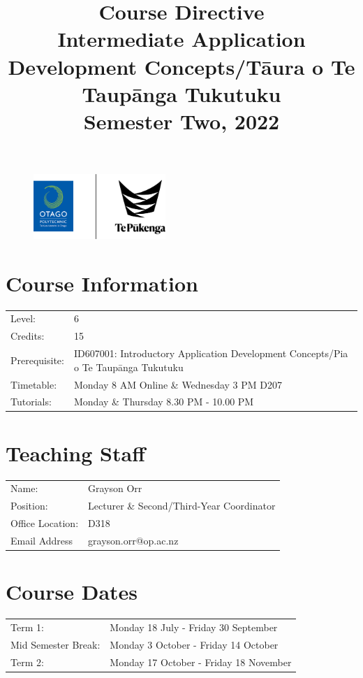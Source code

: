 \documentclass{article}
\author{}
\begin{document}
\begin{figure}
	\includegraphics[width=50mm]{../img/logo.png}
\end{figure}

\title{Course Directive\\Intermediate Application Development Concepts/Tāura o Te Taupānga Tukutuku\\Semester Two, 2022}
\date{}
\maketitle

\section*{Course Information}
\begin{tabular}{ll}
	Level:        & 6 \\
	Credits:      & 15                                                              \\
	Prerequisite: & ID607001: Introductory Application Development Concepts/Pia o Te Taupānga Tukutuku                                                   \\
	Timetable:    & Monday 8 AM Online \& Wednesday 3 PM D207  \\
	Tutorials:          & Monday \& Thursday 8.30 PM - 10.00 PM                                    
\end{tabular}

\section*{Teaching Staff}
\begin{tabular}{ll}
	Name:            & Grayson Orr                           \\
	Position:        & Lecturer \& Second/Third-Year Coordinator \\
	Office Location: & D318                                 \\
	Email Address    & grayson.orr@op.ac.nz                    \\
\end{tabular}

\section*{Course Dates}
\begin{tabular}{ll}
	Term 1:             &  Monday 18 July - Friday 30 September \\
	Mid Semester Break: &  Monday 3 October - Friday 14 October     \\
	Term 2:             &  Monday 17 October - Friday 18 November      \\
\end{tabular}
\end{document}
